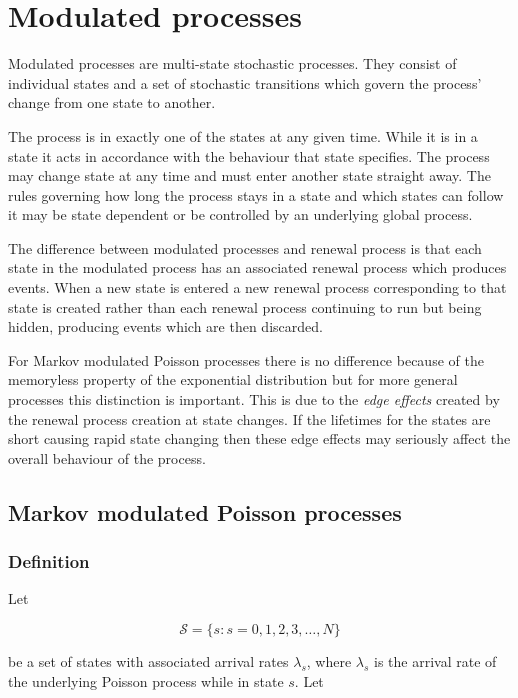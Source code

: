 \section{Modulated processes}

Modulated processes are multi-state stochastic processes.  They
consist of individual states and a set of stochastic transitions which
govern the process' change from one state to another.

The process is in exactly one of the states at any given time.  While
it is in a state it acts in accordance with the behaviour that state
specifies.  The process may change state at any time and must enter
another state straight away.  The rules governing how long the process
stays in a state and which states can follow it may be state dependent
or be controlled by an underlying global process.

The difference between modulated processes and renewal process is that
each state in the modulated process has an associated renewal process
which produces events.  When a new state is entered a new renewal
process corresponding to that state is created rather than each
renewal process continuing to run but being hidden, producing events
which are then discarded.

For Markov modulated Poisson processes there is no difference because
of the memoryless property of the exponential distribution but for
more general processes this distinction is important.  This is due to
the {\em edge effects} created by the renewal process creation at
state changes.  If the lifetimes for the states are short causing
rapid state changing then these edge effects may seriously affect the
overall behaviour of the process.

\subsection{Markov modulated Poisson processes}

\subsubsection{Definition}

Let

\[ \mathcal{S} = \{s : s = 0,1,2,3,\ldots, N \} \]

be a set of states with associated arrival rates $\lambda_s$, where
$\lambda_s$ is the arrival rate of the underlying Poisson process
while in state $s$.  Let

